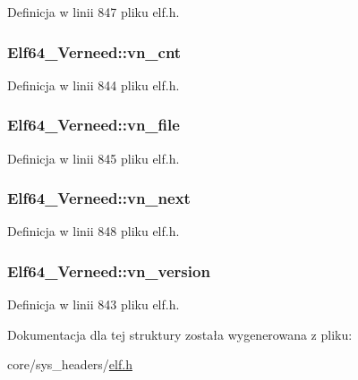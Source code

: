 Definicja w linii 847 pliku elf.\-h.

\hypertarget{struct_elf64___verneed_ab8bae5b901cc7007685f35d43cf63884}{
\subsubsection[{vn\-\_\-cnt}]{ Elf64\-\_\-\-Verneed\-::vn\-\_\-cnt}}\label{struct_elf64___verneed_ab8bae5b901cc7007685f35d43cf63884}


Definicja w linii 844 pliku elf.\-h.

\hypertarget{struct_elf64___verneed_acb9149fec79d7eefb3f1d6300be2125f}{
\subsubsection[{vn\-\_\-file}]{ Elf64\-\_\-\-Verneed\-::vn\-\_\-file}}\label{struct_elf64___verneed_acb9149fec79d7eefb3f1d6300be2125f}


Definicja w linii 845 pliku elf.\-h.

\hypertarget{struct_elf64___verneed_a8036329a9f5ad3a4006f16cbe3c9e866}{
\subsubsection[{vn\-\_\-next}]{ Elf64\-\_\-\-Verneed\-::vn\-\_\-next}}\label{struct_elf64___verneed_a8036329a9f5ad3a4006f16cbe3c9e866}


Definicja w linii 848 pliku elf.\-h.

\hypertarget{struct_elf64___verneed_abbe3d560e7f69253f3c468f2c9d30f99}{
\subsubsection[{vn\-\_\-version}]{ Elf64\-\_\-\-Verneed\-::vn\-\_\-version}}\label{struct_elf64___verneed_abbe3d560e7f69253f3c468f2c9d30f99}


Definicja w linii 843 pliku elf.\-h.



Dokumentacja dla tej struktury została wygenerowana z pliku\-:\begin{DoxyCompactItemize}
\item 
core/sys\-\_\-headers/\hyperlink{elf_8h}{elf.\-h}\end{DoxyCompactItemize}
